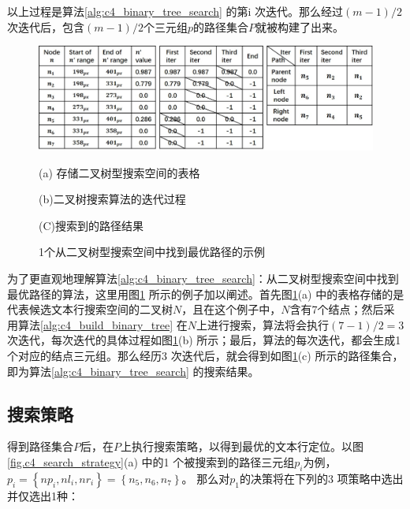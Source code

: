         以上过程是算法\ref{alg:c4_binary_tree_search} 的第i 次迭代。那么经过$(m-1)/2$次迭代后，包含$(m-1)/2$个三元组$p$的路径集合$P$就被构建了出来。

        \begin{figure}[!h]
        \centering
        \includegraphics[width=\textwidth]{./figures/c4_bianry_tree_search.jpg}
        \begin{minipage}[t]{0.33\linewidth}
        \centerline{\small (a) 存储二叉树型搜索空间的表格}
        \end{minipage}
        \begin{minipage}[t]{0.33\linewidth}
        \centerline{\small(b)二叉树搜索算法的迭代过程}
        \end{minipage}
        \begin{minipage}[t]{0.26\linewidth}
        \centerline{\small(C)搜索到的路径结果}
        \end{minipage}
        \caption{1个从二叉树型搜索空间中找到最优路径的示例}
        \label{fig.c4_bianry_tree_search}
        \end{figure}

        为了更直观地理解算法\ref{alg:c4_binary_tree_search}：从二叉树型搜索空间中找到最优路径的算法，这里用图\ref{fig.c4_bianry_tree_search} 所示的例子加以阐述。首先图\ref{fig.c4_bianry_tree_search}(a) 中的表格存储的是代表候选文本行搜索空间的二叉树$N$，且在这个例子中，$N$含有7个结点；然后采用算法\ref{alg:c4_build_binary_tree} 在$N$上进行搜索，算法将会执行$(7-1)/2=3$ 次迭代，每次迭代的具体过程如图\ref{fig.c4_bianry_tree_search}(b) 所示；最后，算法的每次迭代，都会生成1 个对应的结点三元组。那么经历3 次迭代后，就会得到如图\ref{fig.c4_bianry_tree_search}(c) 所示的路径集合，即为算法\ref{alg:c4_binary_tree_search} 的搜索结果。

        \subsection{搜索策略}
        \label{sec.c4_searching strategies}

        得到路径集合$P$后，在$P$上执行搜索策略，以得到最优的文本行定位。以图\ref{fig.c4_search_strategy}(a) 中的1 个被搜索到的路径三元组$p_i$为例，$p_i=\left\{np_i,nl_i,nr_i\right\}=\left\{n_5,n_6,n_7\right\}$。 那么对$p_1$的决策将在下列的3 项策略中选出并仅选出1种：

